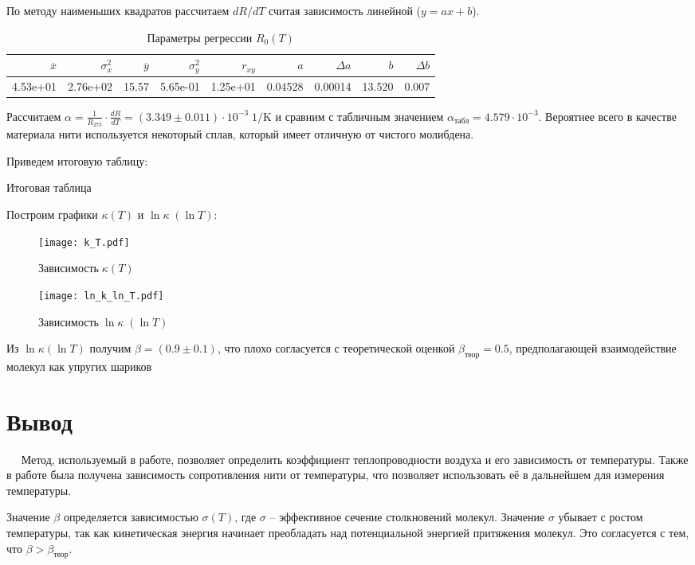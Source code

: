 \documentclass[12pt,a4paper]{article}
\begin{document}
	По методу наименьших квадратов рассчитаем $dR/dT$ считая зависимость линейной ($y = ax + b$).
	
	\begin{table}[h]
		\caption{Параметры регрессии $R_0(T)$}
		\begin{tabular}{rrrrrrrrr}
			\toprule
			$\overline{x}$ & $\sigma_x^2$ & $\overline{y}$ & $\sigma_y^2$ & $r_{xy}$ & $a$ & $\Delta a$ & $b$ & $\Delta b$ \\
			\midrule
			4.53e+01 & 2.76e+02 & 15.57 & 5.65e-01 & 1.25e+01 & 0.04528 & 0.00014 & 13.520 & 0.007 \\
			\bottomrule
		\end{tabular}
	\end{table}

	Рассчитаем $\alpha = \frac{1}{R_{273}} \cdot \frac{dR}{dT} = (3.349 \pm 0.011) \cdot 10^{-3} \; 1/\text{K}$ и сравним с табличным значением $\alpha_{\text{табл}} = 4.579 \cdot 10^{-3}$.
	Вероятнее всего в качестве материала нити используется некоторый сплав, который имеет отличную от чистого молибдена.
	
	Приведем итоговую таблицу:

	\begin{table}[h]
		\caption{Итоговая таблица}
		
	\end{table}
		
	Построим графики $\kappa (T)$ и $\ln \kappa \; (\ln T)$:
	
	\begin{figure}[H]
		\texttt{[image: k\_T.pdf]}
		\caption{$ \text{Зависимость} \; \kappa (T)$}
	\end{figure}
	
	
	\begin{figure}[H]
		\texttt{[image: ln\_k\_ln\_T.pdf]}
		\caption{$ \text{Зависимость} \; \ln \kappa \; (\ln T)$}
	\end{figure}
	
	Из $\ln \kappa (\ln T)$ получим $\beta = (0.9 \pm 0.1)$, что плохо согласуется с теоретической оценкой $\beta_{\text{теор}} = 0.5$, предполагающей взаимодействие молекул как упругих шариков
	
	\section*{Вывод}
	
	$\quad$ Метод, используемый в работе, позволяет определить коэффициент теплопроводности воздуха и его зависимость от температуры. Также в работе была получена зависимость сопротивления нити от температуры, что позволяет использовать её в дальнейшем для измерения температуры.
	
	Значение $\beta$ определяется зависимостью $\sigma (T)$, где $\sigma$ -- эффективное сечение столкновений молекул. Значение $\sigma$ убывает с ростом температуры, так как кинетическая энергия начинает преобладать над потенциальной энергией притяжения молекул. Это согласуется с тем, что $\beta > \beta_{\text{теор}}$. 
	
\end{document}
